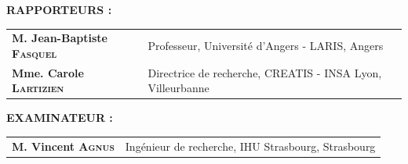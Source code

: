\begin{titlingpage}
{\vspace{0.5cm}

\textbf{RAPPORTEURS :}\\

\hspace*{0.5cm}
\begin{tabular}{p{6cm}l}
	\textbf{M. Jean-Baptiste \textsc{Fasquel}} & Professeur, Universit\'e d'Angers - LARIS, Angers \\
	\textbf{Mme. Carole \textsc{Lartizien}} & Directrice de recherche,  CREATIS - INSA Lyon, Villeurbanne
\end{tabular}


\vspace{0.5cm}

\textbf{EXAMINATEUR :}\\

\hspace*{0.5cm}
\begin{tabular}{p{6cm}l}
	\textbf{M. Vincent \textsc{Agnus}} & Ing\'enieur de recherche, IHU Strasbourg, Strasbourg
\end{tabular}

}



\end{titlingpage}
\cleardoublepage